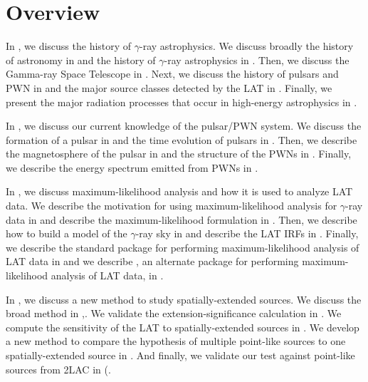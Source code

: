 \chapter{Overview}

In , we discuss the history of $\gamma$-ray
astrophysics. We discuss broadly the history of astronomy in
 and the history of $\gamma$-ray
astrophysics in .  Then, we discuss
the \fermi Gamma-ray Space Telescope in .
Next, we discuss the history of pulsars and \ac{PWN} in
 and the major source classes detected by the
\ac{LAT} in .  Finally, we present the
major radiation processes that occur in high-energy astrophysics in
.

In , we discuss our current knowledge of
the pulsar/\ac{PWN} system.  We discuss the formation of a pulsar
in  and the time evolution of pulsars
in .  Then, we describe the magnetosphere of
the pulsar in  and the structure of the
\acp{PWN} in .  Finally, we describe the energy
spectrum emitted from \acp{PWN} in .

In , we discuss maximum-likelihood
analysis and how it is used to analyze \ac{LAT} data.
We describe the motivation for using maximum-likelihood analysis
for $\gamma$-ray data in 
and describe the maximum-likelihood formulation in
.  Then, we describe how to build
a model of the $\gamma$-ray sky in  and describe
the \ac{LAT} \acp{IRF} in .
Finally, 
we describe the standard
package \gtlike for performing maximum-likelihood analysis of \ac{LAT}
data in  and we describe \pointlike,
an alternate package for performing maximum-likelihood analysis of
\ac{LAT} data, in .


In , we discuss a new method
to study spatially-extended sources.  We discuss the broad
method in ,.  We validate the
extension-significance calculation in . We
compute the sensitivity of the \ac{LAT} to spatially-extended sources
in .  We develop a new method to
compare the hypothesis of multiple point-like sources to one
spatially-extended source in .
And finally, we validate our test against point-like sources from \ac{2LAC}
in (.

